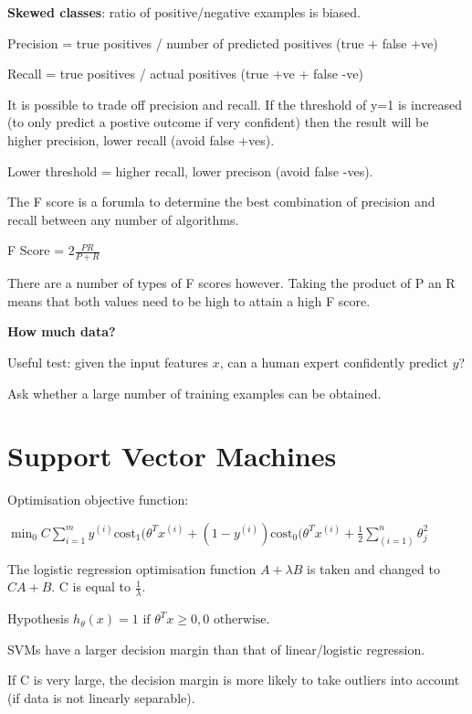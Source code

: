 \documentclass[12pt, a4paper]{article}
\begin{document}
{    \textbf{Skewed classes}: ratio of positive/negative examples is biased.

    Precision = true positives / number of predicted positives (true + false
    +ve)

    Recall = true positives / actual positives (true +ve + false -ve)

    It is possible to trade off precision and recall. If the threshold of
    y=1 is increased (to only predict a postive outcome if very confident)
    then the result will be higher precision, lower recall (avoid false
    +ves). 

    Lower threshold = higher recall, lower precison (avoid false -ves).

    The F score is a forumla to determine the best combination of precision 
    and recall between any number of algorithms.

    F Score = $2\frac{PR}{P+R}$

    There are a number of types of F scores however. Taking the product of 
    P an R means that both values need to be high to attain a high F score.

    \textbf{How much data?}
    
    Useful test: given the input features $x$, can a human expert confidently 
    predict $y$?

    Ask whether a large number of training examples can be obtained. 

  \newpage

\section{Support Vector Machines}

  Optimisation objective function: 
  
  $\min_0 C \displaystyle\sum_{i=1}^m 
  y^{(i)}\text{cost}_1(\theta^Tx^{(i)} + (1-y^{(i)}) \text{cost}_0
  (\theta^Tx^{(i)} + \frac{1}{2} \displaystyle\sum_{(i=1)}^n \theta_j^2$

  The logistic regression optimisation function $A + \lambda B$ is taken and 
  changed to $CA+B$. C is equal to $\frac{1}{\lambda}$.

  Hypothesis $h_\theta(x) = 1 \text{ if } \theta^Tx \geq 0,
  0 \text{ otherwise.}$
    
  SVMs have a larger decision margin than that of linear/logistic regression.
  
  If C is very large, the decision margin is more likely to take outliers into
  account (if data is not linearly separable).
  
}
\end{document}
